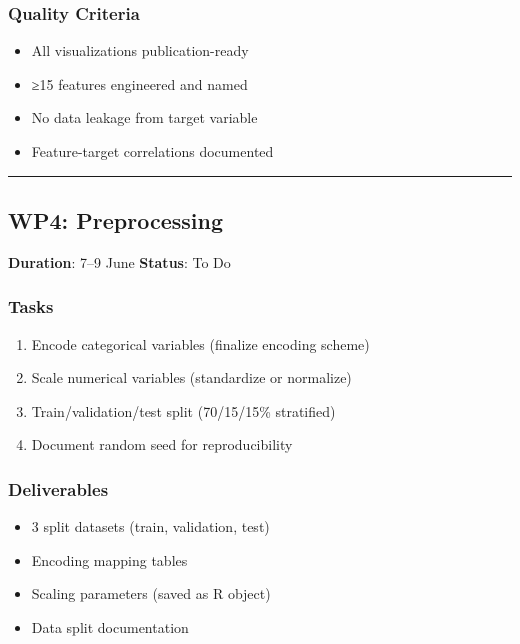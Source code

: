 \documentclass[
  english,
  letterpaper,
  DIV=11,
  numbers=noendperiod]{scrreprt}
\providecommand{\tightlist}{%
  \setlength{\itemsep}{0pt}\setlength{\parskip}{0pt}}
\begin{document}
\subsubsection{Quality Criteria}\label{quality-criteria-2}

\begin{itemize}
\tightlist
\item[$\square$]
  All visualizations publication-ready
\item[$\square$]
  ≥15 features engineered and named
\item[$\square$]
  No data leakage from target variable
\item[$\square$]
  Feature-target correlations documented
\end{itemize}

\begin{center}\rule{0.5\linewidth}{0.5pt}\end{center}

\subsection{WP4: Preprocessing}\label{wp4-preprocessing}

\textbf{Duration}: 7--9 June \textbar{} \textbf{Status}: To Do

\subsubsection{Tasks}\label{tasks-3}

\begin{enumerate}
\def\labelenumi{\arabic{enumi}.}
\tightlist
\item
  Encode categorical variables (finalize encoding scheme)
\item
  Scale numerical variables (standardize or normalize)
\item
  Train/validation/test split (70/15/15\% stratified)
\item
  Document random seed for reproducibility
\end{enumerate}

\subsubsection{Deliverables}\label{deliverables-4}

\begin{itemize}
\tightlist
\item
  3 split datasets (train, validation, test)
\item
  Encoding mapping tables
\item
  Scaling parameters (saved as R object)
\item
  Data split documentation
\end{itemize}
\end{document}
